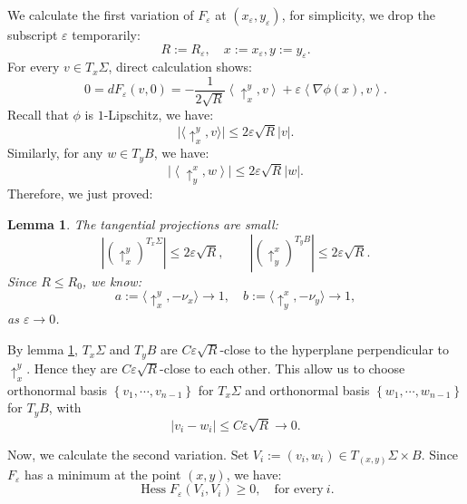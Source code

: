 \documentclass[reqno, 11pt]{amsart}
\theoremstyle{plain}
\newtheorem{lemma}[lemma]{Lemma}
\theoremstyle{definition}
\theoremstyle{remark}
\numberwithin{equation}{section}
\begin{document}
We calculate the first variation of $F_{\varepsilon}$ at $(x_{\varepsilon}, y_{\varepsilon})$, for simplicity, we drop the subscript $\varepsilon$ temporarily:
\begin{equation*}
	R:=R_{\varepsilon},\quad x:=x_{\varepsilon}, y:=y_{\varepsilon}.
\end{equation*}
For every $v\in T_{x}\Sigma$, direct calculation shows:
\begin{equation*}
	0=dF_{\varepsilon}(v, 0)= -\frac{1}{2\sqrt{R}} \left\langle \uparrow_{x}^{y}, v \right\rangle + \varepsilon \left\langle \nabla \phi(x), v \right\rangle. 
\end{equation*}
Recall that $\phi$ is $1$-Lipschitz, we have:
\begin{equation*}
	\Big|\Big\langle \uparrow_{x}^{y}, v \Big\rangle\Big| \le 2 \varepsilon \sqrt{R} |v|.
\end{equation*}
Similarly, for any $w\in T_{y}B$, we have:
\begin{equation*}
	\Big|\left\langle \uparrow_{y}^{x}, w \right\rangle\Big| \le 2 \varepsilon \sqrt{R} |w|.
\end{equation*}
Therefore, we just proved:
\begin{lemma}\label{lem:NormalConvergence}
	The tangential projections are small:
	\[
		\left|(\uparrow_x^y)^{T_x\Sigma}\right|\le 2\varepsilon\sqrt R,\qquad \left|(\uparrow_y^x)^{T_yB}\right| \le 2\varepsilon\sqrt R.      
	\]
	Since $R\le R_0$, we know:
	\begin{equation}
		a:=\langle \uparrow_{x}^{y}, -\nu_{x} \rangle \to 1, \quad  
		b:=\langle \uparrow_{y}^{x}, -\nu_{y} \rangle \to 1,
	\end{equation}
	 as $\varepsilon\to 0$.
\end{lemma}

By lemma \ref{lem:NormalConvergence}, $T_{x}\Sigma$ and $T_{y}B$ are $C \varepsilon \sqrt{R}$-close to the hyperplane perpendicular to $\uparrow_{x}^{y}$. Hence they are $C \varepsilon \sqrt{R}$-close to each other. This allow us to choose orthonormal basis $\left\{ v_{1}, \cdots, v_{n-1} \right\}$ for $T_{x}\Sigma$ and orthonormal basis $\left\{ w_{1}, \cdots, w_{n-1} \right\}$ for $T_{y}B$, with
\begin{equation}\label{eq:KEY}
	|v_{i}-w_{i}| \le C \varepsilon\sqrt{R}\to 0.
\end{equation}

Now, we calculate the second variation. Set $V_{i}:=(v_{i}, w_{i})\in T_{(x, y)}\Sigma\times B$. Since $F_{\varepsilon}$ has a minimum at the point $(x, y)$, we have:
\begin{equation*}
	\operatorname{Hess} F_{\varepsilon}(V_{i}, V_{i}) \ge 0, \quad \text{for every}\ i.
\end{equation*}
\end{document}
